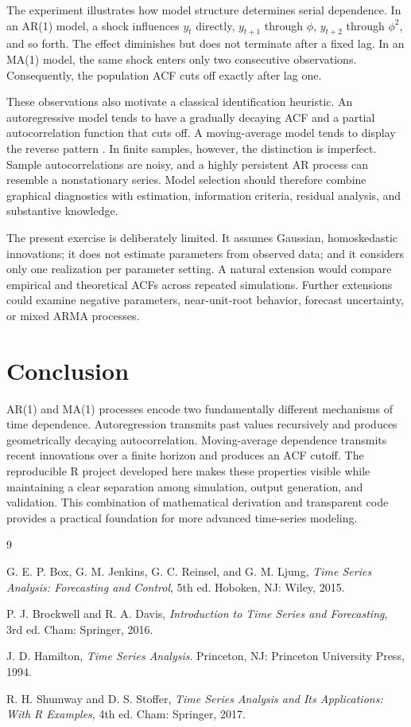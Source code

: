 \documentclass[10pt]{article}
\begin{document}
The experiment illustrates how model structure determines serial dependence.
In an AR(1) model, a shock influences $y_t$ directly, $y_{t+1}$ through
$\phi$, $y_{t+2}$ through $\phi^2$, and so forth. The effect diminishes but does
not terminate after a fixed lag. In an MA(1) model, the same shock enters only
two consecutive observations. Consequently, the population ACF cuts off
exactly after lag one.

These observations also motivate a classical identification heuristic. An
autoregressive model tends to have a gradually decaying ACF and a partial
autocorrelation function that cuts off. A moving-average model tends to display
the reverse pattern \cite{shumway2017}. In finite samples, however, the
distinction is imperfect. Sample autocorrelations are noisy, and a highly
persistent AR process can resemble a nonstationary series. Model selection
should therefore combine graphical diagnostics with estimation, information
criteria, residual analysis, and substantive knowledge.

The present exercise is deliberately limited. It assumes Gaussian,
homoskedastic innovations; it does not estimate parameters from observed data;
and it considers only one realization per parameter setting. A natural
extension would compare empirical and theoretical ACFs across repeated
simulations. Further extensions could examine negative parameters,
near-unit-root behavior, forecast uncertainty, or mixed ARMA processes.

\section{Conclusion}

AR(1) and MA(1) processes encode two fundamentally different mechanisms of
time dependence. Autoregression transmits past values recursively and produces
geometrically decaying autocorrelation. Moving-average dependence transmits
recent innovations over a finite horizon and produces an ACF cutoff. The
reproducible R project developed here makes these properties visible while
maintaining a clear separation among simulation, output generation, and
validation. This combination of mathematical derivation and transparent code
provides a practical foundation for more advanced time-series modeling.

\small
\begin{thebibliography}{9}
\setlength{\itemsep}{0.25em}

G. E. P. Box, G. M. Jenkins, G. C. Reinsel, and G. M. Ljung,
\textit{Time Series Analysis: Forecasting and Control}, 5th ed.
Hoboken, NJ: Wiley, 2015.

P. J. Brockwell and R. A. Davis,
\textit{Introduction to Time Series and Forecasting}, 3rd ed.
Cham: Springer, 2016.

J. D. Hamilton,
\textit{Time Series Analysis}.
Princeton, NJ: Princeton University Press, 1994.

R. H. Shumway and D. S. Stoffer,
\textit{Time Series Analysis and Its Applications: With R Examples},
4th ed. Cham: Springer, 2017.

\end{thebibliography}
\end{document}

